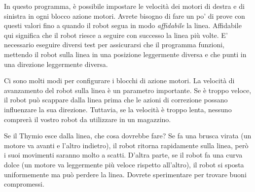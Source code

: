 In questo programma, è possibile impostare le velocità dei
motori di destra e di sinistra in ogni blocco azione motori. Avrete bisogno di
fare un po' di prove con questi valori fino a quando il robot segua in modo \emph{affidabile} la linea. Affidabile qui
significa che il robot riesce a seguire con successo la linea più volte.
E' necessario eseguire
diversi test per assicurarsi che il programma funzioni, mettendo il robot sulla linea in una posizione leggermente diversa e
che punti in una direzione leggermente diversa.

Ci sono molti modi per configurare i blocchi di azione motori.
La velocità di avanzamento del robot sulla linea è un parametro importante.
Se è troppo veloce, il robot può scappare dalla linea prima che le azioni di correzione possano influenzare la sua direzione. Tuttavia, se la velocità è troppo lenta, nessuno comprerà il vostro robot da utilizzare in un magazzino.

Se il Thymio esce dalla linea, che cosa dovrebbe fare?
Se fa una brusca virata (un motore va avanti e l'altro indietro),
il robot ritorna rapidamente sulla linea, però i suoi movimenti saranno molto a scatti.
D'altra parte, se il robot fa una curva dolce (un motore va leggermente più veloce rispetto all'altro), il robot si sposta uniformemente ma può perdere la linea.
Dovrete sperimentare per trovare buoni compromessi.

\newpage


\vfill


\vfill

